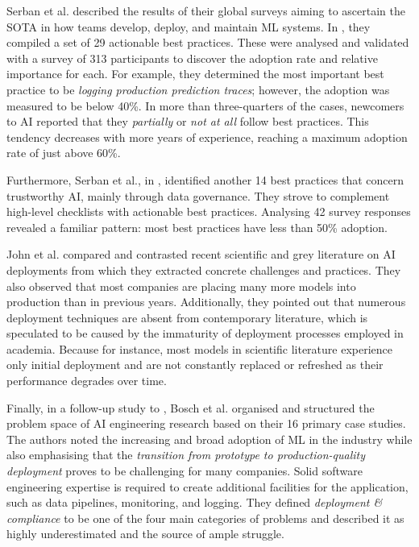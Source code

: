Serban et al. \cite{serban2020adoption,serban2021practices} described the results of their global surveys aiming to ascertain the SOTA in how teams develop, deploy, and maintain ML systems. In \cite{serban2020adoption}, they compiled a set of 29 actionable best practices. These were analysed and validated with a survey of 313 participants to discover the adoption rate and relative importance for each. For example, they determined the most important best practice to be \textit{logging production prediction traces}; however, the adoption was measured to be below 40\%. In more than three-quarters of the cases, newcomers to AI reported that they \textit{partially} or \textit{not at all} follow best practices. This tendency decreases with more years of experience, reaching a maximum adoption rate of just above 60\%. 

Furthermore, Serban et al., in \cite{serban2021practices}, identified another 14 best practices that concern trustworthy AI, mainly through data governance. They strove to complement high-level checklists with actionable best practices. Analysing 42 survey responses revealed a familiar pattern: most best practices have less than 50\% adoption.

John et al. \cite{john2020architecting} compared and contrasted recent scientific and grey literature on AI deployments from which they extracted concrete challenges and practices. They also observed that most companies are placing many more models into production than in previous years. Additionally, they pointed out that numerous deployment techniques are absent from contemporary literature, which is speculated to be caused by the immaturity of deployment processes employed in academia. Because for instance, most models in scientific literature experience only initial deployment and are not constantly replaced or refreshed as their performance degrades over time.

Finally, in a follow-up study to \cite{john2020architecting}, Bosch et al. \cite{bosch2021engineering} organised and structured the problem space of AI engineering research based on their 16 primary case studies. The authors noted the increasing and broad adoption of ML in the industry while also emphasising that the \textit{transition from prototype to production-quality deployment} proves to be challenging for many companies. Solid software engineering expertise is required to create additional facilities for the application, such as data pipelines, monitoring, and logging. They defined \textit{deployment \& compliance} to be one of the four main categories of problems and described it as highly underestimated and the source of ample struggle.

